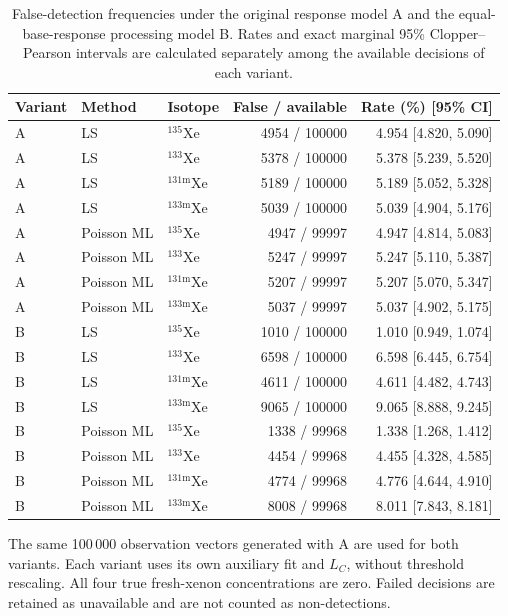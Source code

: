 \begin{table}[t]
\centering\small
\caption{False-detection frequencies under the original response model A and the equal-base-response processing model B. Rates and exact marginal 95\% Clopper--Pearson intervals are calculated separately among the available decisions of each variant.}
\label{tab:xemat-equal-memory-responses}
\begin{tabular}{lllrr}
\hline
Variant & Method & Isotope & False / available & Rate (\%) [95\% CI] \\
\hline
A & LS & $^{135}\mathrm{Xe}$ & 4954 / 100000 & 4.954 [4.820, 5.090] \\
A & LS & $^{133}\mathrm{Xe}$ & 5378 / 100000 & 5.378 [5.239, 5.520] \\
A & LS & $^{131\mathrm{m}}\mathrm{Xe}$ & 5189 / 100000 & 5.189 [5.052, 5.328] \\
A & LS & $^{133\mathrm{m}}\mathrm{Xe}$ & 5039 / 100000 & 5.039 [4.904, 5.176] \\
A & Poisson ML & $^{135}\mathrm{Xe}$ & 4947 / 99997 & 4.947 [4.814, 5.083] \\
A & Poisson ML & $^{133}\mathrm{Xe}$ & 5247 / 99997 & 5.247 [5.110, 5.387] \\
A & Poisson ML & $^{131\mathrm{m}}\mathrm{Xe}$ & 5207 / 99997 & 5.207 [5.070, 5.347] \\
A & Poisson ML & $^{133\mathrm{m}}\mathrm{Xe}$ & 5037 / 99997 & 5.037 [4.902, 5.175] \\
B & LS & $^{135}\mathrm{Xe}$ & 1010 / 100000 & 1.010 [0.949, 1.074] \\
B & LS & $^{133}\mathrm{Xe}$ & 6598 / 100000 & 6.598 [6.445, 6.754] \\
B & LS & $^{131\mathrm{m}}\mathrm{Xe}$ & 4611 / 100000 & 4.611 [4.482, 4.743] \\
B & LS & $^{133\mathrm{m}}\mathrm{Xe}$ & 9065 / 100000 & 9.065 [8.888, 9.245] \\
B & Poisson ML & $^{135}\mathrm{Xe}$ & 1338 / 99968 & 1.338 [1.268, 1.412] \\
B & Poisson ML & $^{133}\mathrm{Xe}$ & 4454 / 99968 & 4.455 [4.328, 4.585] \\
B & Poisson ML & $^{131\mathrm{m}}\mathrm{Xe}$ & 4774 / 99968 & 4.776 [4.644, 4.910] \\
B & Poisson ML & $^{133\mathrm{m}}\mathrm{Xe}$ & 8008 / 99968 & 8.011 [7.843, 8.181] \\
\hline
\end{tabular}
\par\smallskip
\begin{minipage}{0.98\textwidth}\footnotesize
The same 100\,000 observation vectors generated with A are used for both variants. Each variant uses its own auxiliary fit and $L_C$, without threshold rescaling. All four true fresh-xenon concentrations are zero. Failed decisions are retained as unavailable and are not counted as non-detections.
\end{minipage}
\end{table}
